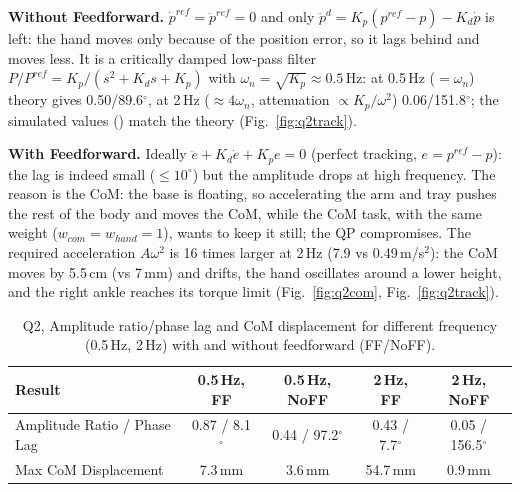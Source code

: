 \documentclass[10pt,a4paper]{article}
\newcommand{\fig}[1]{Fig.~\ref{fig:#1}}
\begin{document}
\textbf{Without Feedforward.} $\dot p^{ref}=\ddot p^{ref}=0$ and only $\ddot p^d = K_p(p^{ref}-p)-K_d\dot p$ is left: the hand moves only because of the position error, so it lags behind and moves less. It is a critically damped low-pass filter $P/P^{ref}=K_p/(s^2+K_ds+K_p)$ with $\omega_n=\sqrt{K_p}\approx0.5$\,Hz: at 0.5\,Hz ($=\omega_n$) theory gives 0.50/89.6$^\circ$, at 2\,Hz ($\approx4\omega_n$, attenuation $\propto K_p/\omega^2$) 0.06/151.8$^\circ$; the simulated values () match the theory (\fig{q2track}).

\textbf{With Feedforward.} Ideally $\ddot e+K_d\dot e+K_pe=0$ (perfect tracking, $e = p^{ref}-p$): the lag is indeed small ($\le10^\circ$) but the amplitude drops at high frequency. The reason is the CoM: the base is floating, so accelerating the arm and tray pushes the rest of the body and moves the CoM, while the CoM task, with the same weight ($w_{com}=w_{hand}=1$), wants to keep it still; the QP compromises. The required acceleration $A\omega^2$ is 16 times larger at 2\,Hz (7.9 vs 0.49\,m/s$^2$): the CoM moves by 5.5\,cm (vs 7\,mm) and drifts, the hand oscillates around a lower height, and the right ankle reaches its torque limit (\fig{q2com}, \fig{q2track}).

\begin{table}[H]
  \begin{center}\small
    \begin{tabular}{lcccc}
      \toprule
      Result                      & 0.5\,Hz, FF        & 0.5\,Hz, NoFF       & 2\,Hz, FF          & 2\,Hz, NoFF          \\
      \midrule
      Amplitude Ratio / Phase Lag & 0.87 / 8.1$^\circ$ & 0.44 / 97.2$^\circ$ & 0.43 / 7.7$^\circ$ & 0.05 / 156.5$^\circ$ \\
      Max CoM Displacement        & 7.3\,mm            & 3.6\,mm             & 54.7\,mm           & 0.9\,mm              \\
      \bottomrule
    \end{tabular}
  \end{center}
  \caption{Q2, Amplitude ratio/phase lag and CoM displacement for different frequency (0.5\,Hz, 2\,Hz) with and without feedforward (FF/NoFF).}
  \label{table:Q2}
\end{table}
\end{document}
